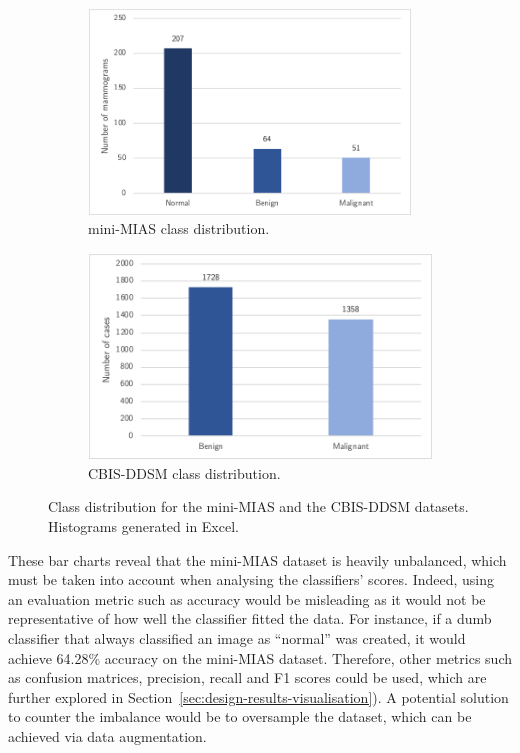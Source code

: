 \begin{figure}[h]
\centering
\begin{subfigure}{.5\textwidth}
  \centering
  \includegraphics[width=0.94\textwidth]{Dissertation/figures/design/mini-mias-balance.png}
  \caption{mini-MIAS class distribution.}
  \label{fig:design-mini-mias-balance}
\end{subfigure}%
\begin{subfigure}{.5\textwidth}
  \centering
  \includegraphics[width=\textwidth]{Dissertation/figures/design/cbis-ddsm-balance.png}
  \caption{CBIS-DDSM class distribution.}
  \label{fig:cbis-ddsm-balance}
\end{subfigure}
\caption{\label{fig:design-datasets-balance}Class distribution for the mini-MIAS and the CBIS-DDSM datasets. Histograms generated in Excel.}
\end{figure}

These bar charts reveal that the mini-MIAS dataset is heavily unbalanced, which must be taken into account when analysing the classifiers' scores. Indeed, using an  evaluation metric such as accuracy would be misleading as it would not be representative of how well the classifier fitted the data. For instance, if a dumb classifier that always classified an image as ``normal'' was created, it would achieve 64.28\% accuracy on the mini-MIAS dataset. Therefore, other metrics such as confusion matrices, precision, recall and F1 scores could be used, which are further explored in Section~\ref{sec:design-results-visualisation}). A potential solution to counter the imbalance would be to oversample the dataset, which can be achieved via data augmentation.


